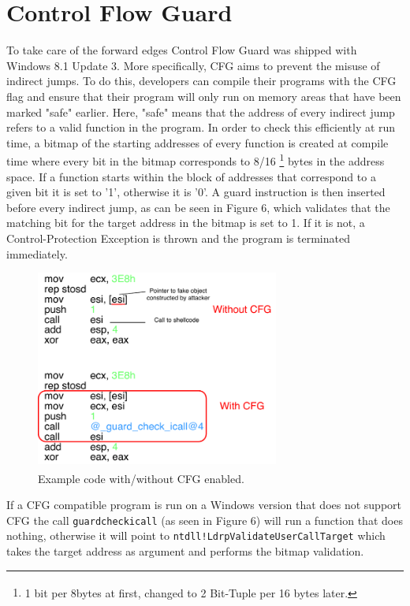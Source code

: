 \documentclass[10pt,twocolumn,a4paper]{article}
\begin{document}
\section{Control Flow Guard}\label{CFG}
To take care of the forward edges Control Flow Guard was shipped with Windows 8.1 Update 3\cite{cfgexplore}.
More specifically, CFG aims to prevent the misuse of indirect jumps.
To do this, developers can compile their programs with the CFG flag and ensure that their program will only run on memory areas that have been marked "safe" earlier\cite{CFG2}.
Here, "safe" means that the address of every indirect jump refers to a valid function in the program.
In order to check this efficiently at run time, a bitmap of the starting addresses of every function is created at compile time where every bit in the bitmap corresponds to 8/16 \footnote{1 bit per 8bytes at first, changed to 2 Bit-Tuple per 16 bytes later\textsuperscript{\cite{tuple}}.} bytes in the address space\cite{cfgexplore}.
If a function starts within the block of addresses that correspond to a given bit it is set to '1', otherwise it is '0'.
A guard instruction is then inserted before every indirect jump, as can be seen in Figure 6, which validates that the matching bit for the target address in the bitmap is set to 1\cite{cfgexplore}. If it is not, a Control-Protection Exception is thrown and the program is terminated immediately\cite{SS}.
\begin{figure}[htbp]
	\includegraphics[keepaspectratio,width=8cm]{fig/cfg}
	\caption{Example code with/without CFG enabled\textsuperscript{\cite{cfgexplore}}.}
\end{figure}
\newline If a CFG compatible program is run on a Windows version that does not support CFG the call \texttt{\textunderscore guard\textunderscore check\textunderscore icall} (as seen in Figure 6) will run a function that does nothing, otherwise it will point to \texttt{ntdll!LdrpValidateUserCallTarget} which takes the target address as argument and performs the bitmap validation\cite{cfgexplore}.
\end{document}
